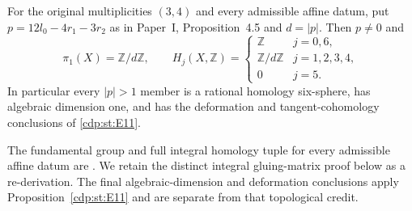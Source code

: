 
\begin{proposition}\label{cdp:st:E19}
For the original multiplicities $(3,4)$ and every admissible affine
datum, put $p=12l_0-4r_1-3r_2$ as in Paper~I, Proposition~4.5 and $d=|p|$.
Then $p\ne0$ and
\[
 \pi_1(X)=\mathbb Z/d\mathbb Z,
 \qquad
 H_j(X,\mathbb Z)=
 \begin{cases}
  \mathbb Z&j=0,6,\\
  \mathbb Z/d\mathbb Z&j=1,2,3,4,\\
  0&j=5.
 \end{cases}
\]
In particular every $|p|>1$ member is a rational homology
six-sphere, has algebraic dimension one, and has the deformation
and tangent-cohomology conclusions of \ref{cdp:st:E11}.
\end{proposition}

The fundamental group and full integral homology tuple for every admissible affine datum are \citet[Theorem~7.17, p.~57; Theorem~7.22, p.~60]{AC2026}. We retain the distinct integral gluing-matrix proof below as a re-derivation. The final algebraic-dimension and deformation conclusions apply Proposition~\ref{cdp:st:E11} and are separate from that topological credit.

